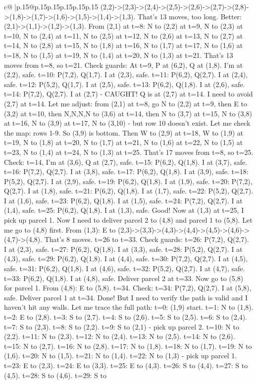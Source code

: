 \documentclass{article}
\begin{document}
{\begin{supertabular}{c@{$\;$}|p{.15\linewidth}@{}p{.15\linewidth}p{.15\linewidth}p{.15\linewidth}p{.15\linewidth}p{.15\linewidth}}
{{{(2,2){-}>(2,3){-}>(2,4){-}>(2,5){-}>(2,6){-}>(2,7){-}>(2,8){-}>(1,8){-}>(1,7){-}>(1,6){-}>(1,5){-}>(1,4){-}>(1,3). That's 13 moves, too long. Better: (2,1){-}>(1,1){-}>(1,2){-}>(1,3). From (2,1) at t=8: N to (2,2) at t=9, N to (2,3) at t=10, N to (2,4) at t=11, N to (2,5) at t=12, N to (2,6) at t=13, N to (2,7) at t=14, N to (2,8) at t=15, N to (1,8) at t=16, N to (1,7) at t=17, N to (1,6) at t=18, N to (1,5) at t=19, N to (1,4) at t=20, N to (1,3) at t=21. That's 13 moves from t=8, so t=21. Check guards: At t=9, P at (6,2), Q at (1,8). I'm at (2,2), safe. t=10: P(7,2), Q(1,7). I at (2,3), safe. t=11: P(6,2), Q(2,7). I at (2,4), safe. t=12: P(5,2), Q(1,7). I at (2,5), safe. t=13: P(6,2), Q(1,8). I at (2,6), safe. t=14: P(7,2), Q(2,7). I at (2,7) {-} CAUGHT! Q is at (2,7) at t=14. I need to avoid (2,7) at t=14. Let me adjust: from (2,1) at t=8, go N to (2,2) at t=9, then E to (3,2) at t=10, then N,N,N,N to (3,6) at t=14, then N to (3,7) at t=15, N to (3,8) at t=16, N to (3,9) at t=17, N to (3,10) {-} but row 10 doesn't exist. Let me check the map: rows 1{-}9. So (3,9) is bottom. Then W to (2,9) at t=18, W to (1,9) at t=19, N to (1,8) at t=20, N to (1,7) at t=21, N to (1,6) at t=22, N to (1,5) at t=23, N to (1,4) at t=24, N to (1,3) at t=25. That's 17 moves from t=8, so t=25. Check: t=14, I'm at (3,6), Q at (2,7), safe. t=15: P(6,2), Q(1,8). I at (3,7), safe. t=16: P(7,2), Q(2,7). I at (3,8), safe. t=17: P(6,2), Q(1,8). I at (3,9), safe. t=18: P(5,2), Q(2,7). I at (2,9), safe. t=19: P(6,2), Q(1,8). I at (1,9), safe. t=20: P(7,2), Q(2,7). I at (1,8), safe. t=21: P(6,2), Q(1,8). I at (1,7), safe. t=22: P(5,2), Q(2,7). I at (1,6), safe. t=23: P(6,2), Q(1,8). I at (1,5), safe. t=24: P(7,2), Q(2,7). I at (1,4), safe. t=25: P(6,2), Q(1,8). I at (1,3), safe. Good! Now at (1,3) at t=25, I pick up parcel 1. Now I need to deliver parcel 2 to (4,8) and parcel 1 to (5,8). Let me go to (4,8) first. From (1,3): E to (2,3){-}>(3,3){-}>(4,3){-}>(4,4){-}>(4,5){-}>(4,6){-}>(4,7){-}>(4,8). That's 8 moves. t=26 to t=33. Check guards: t=26: P(7,2), Q(2,7). I at (2,3), safe. t=27: P(6,2), Q(1,8). I at (3,3), safe. t=28: P(5,2), Q(2,7). I at (4,3), safe. t=29: P(6,2), Q(1,8). I at (4,4), safe. t=30: P(7,2), Q(2,7). I at (4,5), safe. t=31: P(6,2), Q(1,8). I at (4,6), safe. t=32: P(5,2), Q(2,7). I at (4,7), safe. t=33: P(6,2), Q(1,8). I at (4,8), safe. Deliver parcel 2 at t=33. Now go to (5,8) for parcel 1. From (4,8): E to (5,8). t=34. Check: t=34: P(7,2), Q(2,7). I at (5,8), safe. Deliver parcel 1 at t=34. Done! But I need to verify the path is valid and I haven't hit any walls. Let me trace the full path: t=0: (1,9) start. t=1: N to (1,8). t=2: E to (2,8). t=3: S to (2,7). t=4: S to (2,6). t=5: S to (2,5). t=6: S to (2,4). t=7: S to (2,3). t=8: S to (2,2). t=9: S to (2,1) {-} pick up parcel 2. t=10: N to (2,2). t=11: N to (2,3). t=12: N to (2,4). t=13: N to (2,5). t=14: N to (2,6). t=15: N to (2,7). t=16: N to (2,8). t=17: N to (1,8). t=18: N to (1,7). t=19: N to (1,6). t=20: N to (1,5). t=21: N to (1,4). t=22: N to (1,3) {-} pick up parcel 1. t=23: E to (2,3). t=24: E to (3,3). t=25: E to (4,3). t=26: S to (4,4). t=27: S to (4,5). t=28: S to (4,6). t=29: S to }}}
\end{supertabular}}
\end{document}
